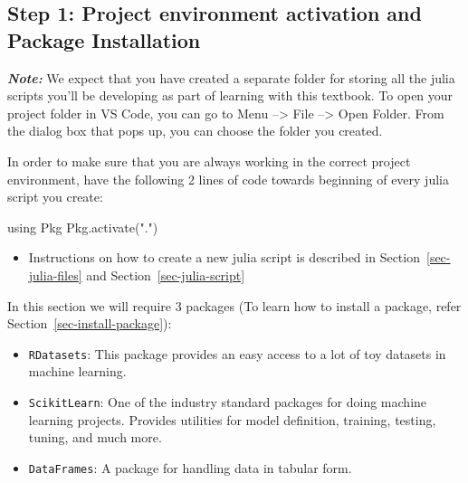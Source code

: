 \documentclass[
  letterpaper,
]{book}
\newenvironment{Shaded}{\begin{snugshade}}{\end{snugshade}}
\newcommand{\BuiltInTok}[1]{\textcolor[rgb]{0.00,0.23,0.31}{#1}}
\newcommand{\FunctionTok}[1]{\textcolor[rgb]{0.28,0.35,0.67}{#1}}
\newcommand{\ImportTok}[1]{\textcolor[rgb]{0.00,0.46,0.62}{#1}}
\newcommand{\NormalTok}[1]{\textcolor[rgb]{0.00,0.23,0.31}{#1}}
\newcommand{\StringTok}[1]{\textcolor[rgb]{0.13,0.47,0.30}{#1}}
\providecommand{\tightlist}{%
  \setlength{\itemsep}{0pt}\setlength{\parskip}{0pt}}\usepackage{longtable,booktabs,array}
\begin{document}
\hypertarget{step-1-project-environment-activation-and-package-installation}{%
\subsection*{Step 1: Project environment activation and Package
Installation}\label{step-1-project-environment-activation-and-package-installation}}

\textbf{\emph{Note:}} We expect that you have created a separate folder
for storing all the julia scripts you'll be developing as part of
learning with this textbook. To open your project folder in VS Code, you
can go to Menu --\textgreater{} File --\textgreater{} Open Folder. From
the dialog box that pops up, you can choose the folder you created.

In order to make sure that you are always working in the correct project
environment, have the following 2 lines of code towards beginning of
every julia script you create:

\begin{Shaded}
\begin{Highlighting}[]
\ImportTok{using} \BuiltInTok{Pkg}
\BuiltInTok{Pkg}\NormalTok{.}\FunctionTok{activate}\NormalTok{(}\StringTok{"."}\NormalTok{)}
\end{Highlighting}
\end{Shaded}

\begin{itemize}
\tightlist
\item
  Instructions on how to create a new julia script is described in
  Section~\ref{sec-julia-files} and Section~\ref{sec-julia-script}
\end{itemize}

In this section we will require 3 packages (To learn how to install a
package, refer Section~\ref{sec-install-package}):

\begin{itemize}
\tightlist
\item
  \texttt{RDatasets}: This package provides an easy access to a lot of
  toy datasets in machine learning.
\item
  \texttt{ScikitLearn}: One of the industry standard packages for doing
  machine learning projects. Provides utilities for model definition,
  training, testing, tuning, and much more.
\item
  \texttt{DataFrames}: A package for handling data in tabular form.
\end{itemize}
\end{document}
